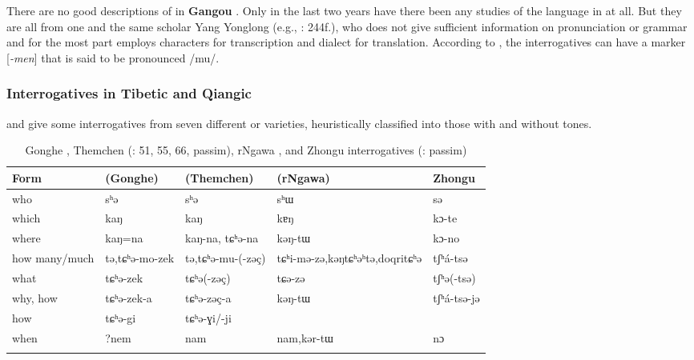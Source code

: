 There are no good descriptions of  in \textbf{Gangou} . Only in the last two years have there been any studies of the language in  at all. But they are all from one and the same scholar Yang Yonglong (e.g., \citeyear{YangYonglong2014}: 244f.), who does not give sufficient information on pronunciation or grammar and for the most part employs  characters for transcription and dialect for translation. According to \citet{YangYonglong2014}, the interrogatives can have a  marker [\textit{-men}]  that is said to be pronounced \mbox{/mu/}.

\subsubsection{Interrogatives in Tibetic and Qiangic}\label{sec:5.9.3.2}

 and  give some interrogatives from seven different \textbf{} or \textbf{} varieties, heuristically classified into those with and without tones.

\begin{table}
\caption{Gonghe \citep[64]{Ebihara2011}, Themchen (\citealt{Haller2004}: 51, 55, 66, passim), rNgawa \citep[82]{Suzuki2006}, and Zhongu interrogatives (\citealt{Sun2003a}: passim)}
\label{tab:trans:11}

\begin{tabularx}{\textwidth}{lQQQQ}
\lsptoprule

\textbf{Form} & \textbf{ (Gonghe)} & \textbf{ (Themchen)} & \textbf{ (rNgawa)} & \textbf{Zhongu}\\
\midrule
who & sʰə & sʰə & sʰɯ & sə\\
which & kaŋ & kaŋ & kɐŋ & kɔ-te\\
where & kaŋ=na & kaŋ-na, tɕʰə-na & kəŋ-tɯ & kɔ-no\\
how many/much & tə,\newline tɕʰə-mo-zek & tə,\newline \mbox{tɕʰə-mu-(-zəç)} & tɕʰi-mə-zə,\newline kəŋtɕʰəʰtə,\newline doqritɕʰə & tʃʰá-tsə\\
what & tɕʰə-zek & tɕʰə(-zəç) & tɕə-zə & tʃʰə(-tsə)\\
why, how & tɕʰə-zek-a & tɕʰə-zəç-a & kəŋ-tɯ & tʃʰá-tsə-jə\\
how & tɕʰə-gi & tɕʰə-ɣi/-ji &  & \\
when & ?nem & nam & nam,\newline kər-tɯ & nɔ\\
\lspbottomrule
\end{tabularx}
\end{table}

